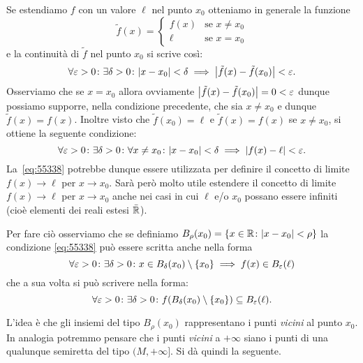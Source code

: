 Se estendiamo $f$ con un valore $\ell$ nel punto $x_0$ otteniamo 
in generale la funzione 
\[
  \tilde f(x) = \begin{cases}
    f(x) & \text{se $x\neq x_0$}\\
    \ell & \text{se $x=x_0$}
  \end{cases}  
\]
e la continuità di $\tilde f$ nel punto $x_0$ si scrive così:
\[
\forall\varepsilon>0\colon \exists \delta>0\colon
{\left|x-x_0\right|}<\delta \implies {\left|\tilde f(x)-\tilde f(x_0)\right|}<\varepsilon.  
\]
Osserviamo che se $x=x_0$ allora ovviamente ${\left|\tilde f(x)-\tilde f(x_0)\right|}
= 0 < \varepsilon$ dunque possiamo supporre, nella condizione precedente, 
che sia $x\neq x_0$ e dunque $\tilde f(x)=f(x)$. 
Inoltre visto che $\tilde f(x_0)=\ell$ 
e $\tilde f(x)=f(x)$ se $x\neq x_0$,
si ottiene 
la seguente condizione:
\begin{equation}\label{eq:55338}
\forall \varepsilon>0\colon \exists \delta >0 \colon 
  \forall x\neq x_0\colon
  {\left|x-x_0\right|}<\delta \implies {\left|f(x) - \ell\right|} < \varepsilon.
\end{equation}
La~\eqref{eq:55338} potrebbe dunque essere utilizzata per definire 
il concetto di limite $f(x)\to \ell$ per $x\to x_0$.
Sarà però molto utile estendere il concetto di limite $f(x)\to \ell$ 
per $x\to x_0$ anche nei casi in cui $\ell$ e/o $x_0$ possano 
essere infiniti (cioè elementi dei reali estesi $\bar {{\mathbb R}}$).

Per fare ciò osserviamo che
se definiamo%
$B_\rho(x_0) = {\left\{ x\in {\mathbb R} \colon {\left|x-x_0\right|}<\rho \right\}}$
la condizione \eqref{eq:55338}
può essere scritta anche nella forma 
\[
  \forall \varepsilon>0\colon \exists \delta >0 \colon 
  x \in B_\delta(x_0)\setminus{\left\{ x_0 \right\}} \implies f(x) \in B_\varepsilon(\ell)  
\]
che a sua volta si può scrivere nella forma:
\[
  \forall \varepsilon>0\colon \exists \delta >0 \colon 
  f(B_\delta(x_0)\setminus{\left\{ x_0 \right\}}) \subseteq  B_\varepsilon(\ell).    
\]

L'idea è che gli insiemi del tipo
$B_\rho(x_0)$ 
rappresentano i punti \emph{vicini} al punto $x_0$. 
In analogia potremmo pensare che i punti \emph{vicini} 
a $+\infty$ siano i punti di una qualunque semiretta 
del tipo $(M,+\infty]$.
Si dà quindi la seguente.


